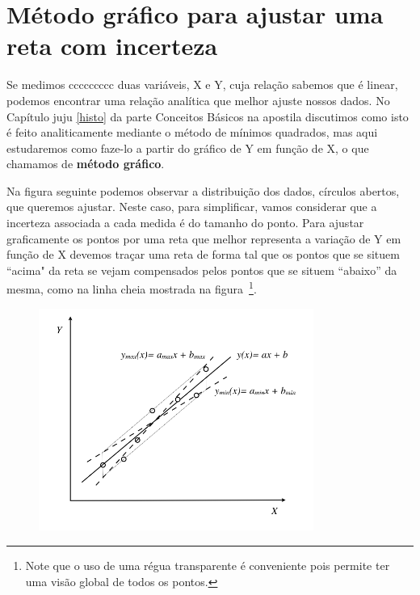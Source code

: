 \chapter{Método gráfico para ajustar uma reta com incerteza}
\label{sec:retagrafico}

\vspace{-0.5cm}

Se medimos ccccccccc duas variáveis, X e Y, cuja relação sabemos que é linear, podemos encontrar uma relação analítica que melhor ajuste nossos dados. No Capítulo juju \ref{histo} da parte Conceitos Básicos na apostila discutimos como isto é feito analiticamente mediante o método de mínimos quadrados, mas aqui estudaremos como faze-lo a partir do gráfico de Y em função de X, o que chamamos de {\bf método gráfico}.

Na figura seguinte podemos observar a distribuição dos dados, círculos abertos, que queremos ajustar. Neste caso, para simplificar, vamos considerar que a incerteza associada a cada medida é do tamanho do ponto.  Para ajustar graficamente os pontos  por uma reta que melhor representa a variação de Y em função de X devemos traçar uma reta de forma tal que os pontos que se situem ``acima" da reta se vejam compensados pelos pontos que se situem ``abaixo'' da mesma, como na linha cheia mostrada na figura~\footnote{Note que o uso de uma régua transparente é conveniente pois permite ter uma visão global de todos os pontos.}. 
\begin{figure}[!h]
\vspace{-0.4cm}
\begin{center}
\includegraphics[width=9cm]{fig/GraficoLinGrafico}
\vspace{-0.4cm}
\end{center}
\end{figure}


